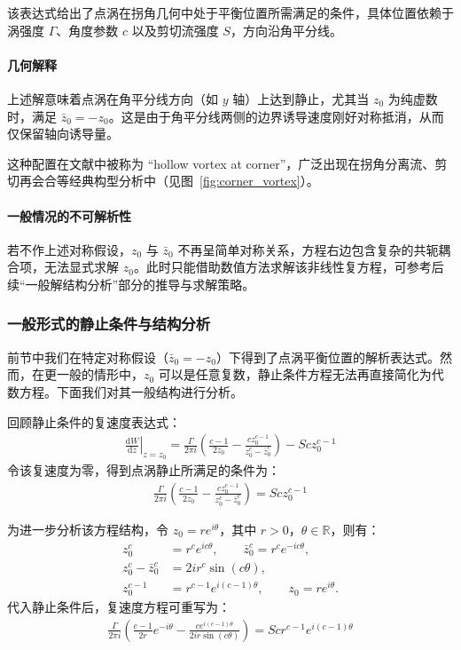 该表达式给出了点涡在拐角几何中处于平衡位置所需满足的条件，具体位置依赖于涡强度 $\Gamma$、角度参数 $c$ 以及剪切流强度 $S$，方向沿角平分线。

\paragraph{几何解释}

上述解意味着点涡在角平分线方向（如 $y$ 轴）上达到静止，尤其当 $z_0$ 为纯虚数时，满足 $\bar{z}_0 = -z_0$。这是由于角平分线两侧的边界诱导速度刚好对称抵消，从而仅保留轴向诱导量。

这种配置在文献中被称为 “hollow vortex at corner”，广泛出现在拐角分离流、剪切再会合等经典构型分析中（见图~\ref{fig:corner_vortex}）。

\paragraph{一般情况的不可解析性}

若不作上述对称假设，$z_0$ 与 $\bar{z}_0$ 不再呈简单对称关系，方程右边包含复杂的共轭耦合项，无法显式求解 $z_0$。此时只能借助数值方法求解该非线性复方程，可参考后续“一般解结构分析”部分的推导与求解策略。

\subsubsection{一般形式的静止条件与结构分析}

前节中我们在特定对称假设（$\bar{z}_0 = -z_0$）下得到了点涡平衡位置的解析表达式。然而，在更一般的情形中，$z_0$ 可以是任意复数，静止条件方程无法再直接简化为代数方程。下面我们对其一般结构进行分析。

回顾静止条件的复速度表达式：
\begin{align}
    \left.\frac{\mathrm{d}W}{\mathrm{d}z}\right|_{z=z_0} = \frac{\Gamma}{2\pi i} \left( \frac{c-1}{2z_0} - \frac{c z_0^{c-1}}{z_0^c - \bar{z}_0^c} \right) - S c z_0^{c-1}
\end{align}
令该复速度为零，得到点涡静止所满足的条件为：
\begin{align}
    \boxed{
    \frac{\Gamma}{2\pi i} \left( \frac{c-1}{2z_0} - \frac{c z_0^{c-1}}{z_0^c - \bar{z}_0^c} \right) = S c z_0^{c-1}
    }
\end{align}

为进一步分析该方程结构，令 $z_0 = r e^{i\theta}$，其中 $r > 0$，$\theta \in \mathbb{R}$，则有：
\begin{align*}
    z_0^c &= r^c e^{ic\theta}, \qquad \bar{z}_0^c = r^c e^{-ic\theta}, \\
    z_0^c - \bar{z}_0^c &= 2i r^c \sin(c\theta), \\
    z_0^{c-1} &= r^{c-1} e^{i(c-1)\theta}, \qquad z_0 = r e^{i\theta}.
\end{align*}
代入静止条件后，复速度方程可重写为：
\begin{align}
    \frac{\Gamma}{2\pi i} \left( \frac{c-1}{2r} e^{-i\theta} - \frac{c e^{i(c-1)\theta}}{2i r \sin(c\theta)} \right) = S c r^{c-1} e^{i(c-1)\theta}
\end{align}

